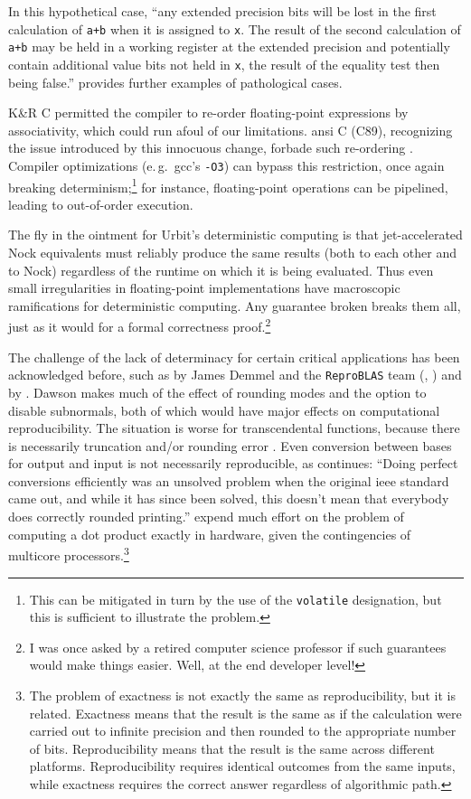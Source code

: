 \documentclass[twoside]{article}
\begin{document}
\noindent
In this hypothetical case, “any extended precision bits will be lost in the first calculation of \texttt{a+b} when it is assigned to \texttt{x}. The result of the second calculation of \texttt{a+b} may be held in a working register at the extended precision and potentially contain additional value bits not held in \texttt{x}, the result of the equality test then being false.”  \citet{Higham2002} provides further examples of pathological cases.

K\&R C permitted the compiler to re-order floating-point expressions by associativity, which could run afoul of our limitations.  {\sc ansi} C (C89), recognizing the issue introduced by this innocuous change, forbade such re-ordering \citep{MacDonald1991}.  Compiler optimizations (e.\,g.\ {\sc gcc}'s \texttt{-O3}) can bypass this restriction, once again breaking determinism;\footnote{This can be mitigated in turn by the use of the \texttt{volatile} designation, but this is sufficient to illustrate the problem.} for instance, floating-point operations can be pipelined, leading to out-of-order execution.

The fly in the ointment for Urbit's deterministic computing is that jet-accelerated Nock equivalents must reliably produce the same results (both to each other and to Nock) regardless of the runtime on which it is being evaluated.  Thus even small irregularities in floating-point implementations have macroscopic ramifications for deterministic computing.  Any guarantee broken breaks them all, just as it would for a formal correctness proof.\footnote{I was once asked by a retired computer science professor if such guarantees would make things easier.  Well, at the end developer level!}

The challenge of the lack of determinacy for certain critical applications has been acknowledged before, such as by James Demmel and the \texttt{ReproBLAS} team (\citet{Demmel2017}, \citet{ReproBLAS}) and by \citeauthor{Dawson2013}.  Dawson makes much of the effect of rounding modes and the option to disable subnormals, both of which would have major effects on computational reproducibility.  The situation is worse for transcendental functions, because there is necessarily truncation and/or rounding error \citep{Dawson2013}.  Even conversion between bases for output and input is not necessarily reproducible, as \citeauthor{Dawson2013} continues:  “Doing perfect conversions efficiently was an unsolved problem when the original {\sc ieee} standard came out, and while it has since been solved, this doesn’t mean that everybody does correctly rounded printing.”  \citet{Koenig2018} expend much effort on the problem of computing a dot product exactly in hardware, given the contingencies of multicore processors.\footnote{The problem of exactness is not exactly the same as reproducibility, but it is related.  Exactness means that the result is the same as if the calculation were carried out to infinite precision and then rounded to the appropriate number of bits.  Reproducibility means that the result is the same across different platforms.  Reproducibility requires identical outcomes from the same inputs, while exactness requires the correct answer regardless of algorithmic path.}
\end{document}
